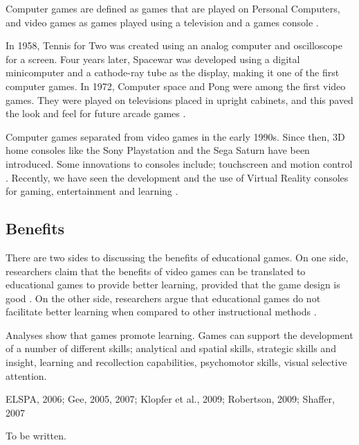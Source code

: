 \documentclass[a4paper,11.5pt]{report}
\numberwithin{figure}{section}
\numberwithin{table}{section}
\numberwithin{equation}{section}
\numberwithin{equation}{section}
\begin{document}
Computer games are defined as games that are played on Personal Computers, and video games as games played using a television and a games console \citep{Cummings07}.

In 1958, Tennis for Two was created using an analog computer and oscilloscope for a screen. Four years later, Spacewar was developed using a digital minicomputer and a cathode-ray tube as the display, making it one of the first computer games. In 1972, Computer space and Pong were among the first video games. They were played on televisions placed in upright cabinets, and this paved the look and feel for future arcade games \citep{TennisForTwo, Lowood2009}.

Computer games separated from video games in the early 1990s. Since then, 3D home consoles like the Sony Playstation and the Sega Saturn have been introduced. Some innovations to consoles include; touchscreen and motion control \citep{Cummings07}. Recently, we have seen the development and the use of Virtual Reality consoles for gaming, entertainment and learning \citep{vrhaptics}.

\subsection{Benefits}

There are two sides to discussing the benefits of educational games. On one side, researchers claim that the benefits of video games can be translated to educational games to provide better learning, provided that the game design is good \citep{Granic2014}. On the other side, researchers argue that educational games do not facilitate better learning when compared to other instructional methods \citep{clark2007}.

Analyses show that games promote learning. Games can support the development of a number of different skills; analytical and spatial skills, strategic skills and insight, learning and recollection capabilities, psychomotor skills, visual selective attention.


ELSPA, 2006; Gee, 2005, 2007; Klopfer et al., 2009; Robertson, 2009; Shaffer, 2007

To be written.

\end{document}
